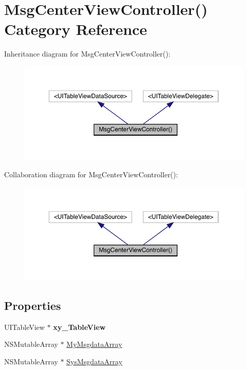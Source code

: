 \hypertarget{category_msg_center_view_controller_07_08}{}\section{Msg\+Center\+View\+Controller() Category Reference}
\label{category_msg_center_view_controller_07_08}


Inheritance diagram for Msg\+Center\+View\+Controller()\+:\nopagebreak
\begin{figure}[H]
\begin{center}
\leavevmode
\includegraphics[width=350pt]{category_msg_center_view_controller_07_08__inherit__graph}
\end{center}
\end{figure}


Collaboration diagram for Msg\+Center\+View\+Controller()\+:\nopagebreak
\begin{figure}[H]
\begin{center}
\leavevmode
\includegraphics[width=350pt]{category_msg_center_view_controller_07_08__coll__graph}
\end{center}
\end{figure}
\subsection*{Properties}
\begin{DoxyCompactItemize}
\item 
\mbox{\label{category_msg_center_view_controller_07_08_a868f86fd34d4e22446e6f43522ce5791}} 
U\+I\+Table\+View $\ast$ {\bfseries xy\+\_\+\+Table\+View}
\item 
N\+S\+Mutable\+Array $\ast$ \mbox{\hyperlink{category_msg_center_view_controller_07_08_a9e7bb45ff4b7d3f25fc3175affa1e5fe}{My\+Msgdata\+Array}}
\item 
N\+S\+Mutable\+Array $\ast$ \mbox{\hyperlink{category_msg_center_view_controller_07_08_aed0c0e3673c8dcac2e6492dae1453d46}{Sys\+Msgdata\+Array}}
\end{DoxyCompactItemize}


